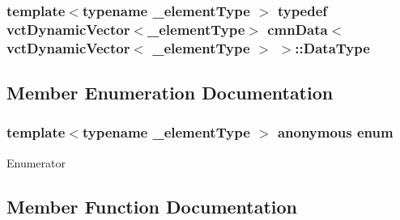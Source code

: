 \subsubsection[{Data\+Type}]{\setlength{\rightskip}{0pt plus 5cm}template$<$typename \+\_\+element\+Type $>$ typedef {\bf vct\+Dynamic\+Vector}$<$\+\_\+element\+Type$>$ {\bf cmn\+Data}$<$ {\bf vct\+Dynamic\+Vector}$<$ \+\_\+element\+Type $>$ $>$\+::{\bf Data\+Type}}\label{classcmn_data_3_01vct_dynamic_vector_3_01__element_type_01_4_01_4_a00a493d9c26fcb200ced1375b3500d17}


\subsection{Member Enumeration Documentation}
\hypertarget{classcmn_data_3_01vct_dynamic_vector_3_01__element_type_01_4_01_4_a05c6f7604114348b65088b0b7724a152}{}\subsubsection[{anonymous enum}]{\setlength{\rightskip}{0pt plus 5cm}template$<$typename \+\_\+element\+Type $>$ anonymous enum}\label{classcmn_data_3_01vct_dynamic_vector_3_01__element_type_01_4_01_4_a05c6f7604114348b65088b0b7724a152}
\begin{Desc}
\item[Enumerator]\par
\begin{description}
\item[{\em 
\hypertarget{classcmn_data_3_01vct_dynamic_vector_3_01__element_type_01_4_01_4_a05c6f7604114348b65088b0b7724a152aca16809e1c2c0a0930f412fea81a9582}{}I\+S\+\_\+\+S\+P\+E\+C\+I\+A\+L\+I\+Z\+E\+D\label{classcmn_data_3_01vct_dynamic_vector_3_01__element_type_01_4_01_4_a05c6f7604114348b65088b0b7724a152aca16809e1c2c0a0930f412fea81a9582}
}]\end{description}
\end{Desc}


\subsection{Member Function Documentation}
\hypertarget{classcmn_data_3_01vct_dynamic_vector_3_01__element_type_01_4_01_4_a0cb719326922e6b70028d52cdc4958e6}{}
